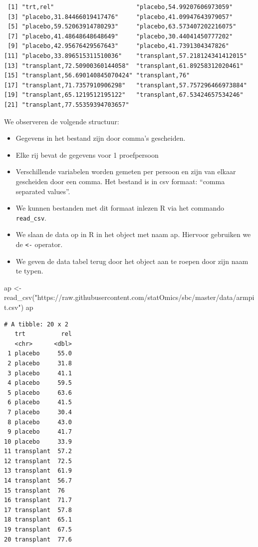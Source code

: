 \documentclass[
  dutch,
  letterpaper,
  12pt]{book}
\newenvironment{Shaded}{\begin{snugshade}}{\end{snugshade}}
\newcommand{\FunctionTok}[1]{\textcolor[rgb]{0.28,0.35,0.67}{#1}}
\newcommand{\NormalTok}[1]{\textcolor[rgb]{0.00,0.23,0.31}{#1}}
\newcommand{\OtherTok}[1]{\textcolor[rgb]{0.00,0.23,0.31}{#1}}
\newcommand{\StringTok}[1]{\textcolor[rgb]{0.13,0.47,0.30}{#1}}
\providecommand{\tightlist}{%
  \setlength{\itemsep}{0pt}\setlength{\parskip}{0pt}}
\theoremstyle{definition}
\theoremstyle{definition}
\theoremstyle{definition}
\theoremstyle{remark}
\begin{document}
\begin{verbatim}
 [1] "trt,rel"                       "placebo,54.99207606973059"    
 [3] "placebo,31.84466019417476"     "placebo,41.09947643979057"    
 [5] "placebo,59.52063914780293"     "placebo,63.573407202216075"   
 [7] "placebo,41.48648648648649"     "placebo,30.44041450777202"    
 [9] "placebo,42.95676429567643"     "placebo,41.7391304347826"     
[11] "placebo,33.896515311510036"    "transplant,57.218124341412015"
[13] "transplant,72.50900360144058"  "transplant,61.89258312020461" 
[15] "transplant,56.690140845070424" "transplant,76"                
[17] "transplant,71.7357910906298"   "transplant,57.757296466973884"
[19] "transplant,65.1219512195122"   "transplant,67.53424657534246" 
[21] "transplant,77.55359394703657" 
\end{verbatim}

We observeren de volgende structuur:

\begin{itemize}
\tightlist
\item
  Gegevens in het bestand zijn door comma's gescheiden.
\item
  Elke rij bevat de gegevens voor 1 proefpersoon
\item
  Verschillende variabelen worden gemeten per persoon en zijn van elkaar
  gescheiden door een comma. Het bestand is in csv formaat: ``comma
  separated values''.
\item
  We kunnen bestanden met dit formaat inlezen R via het commando
  \texttt{read\_csv}.
\item
  We slaan de data op in R in het object met naam ap. Hiervoor gebruiken
  we de \texttt{\textless{}-} operator.
\item
  We geven de data tabel terug door het object aan te roepen door zijn
  naam te typen.
\end{itemize}

\begin{Shaded}
\begin{Highlighting}[]
\NormalTok{ap }\OtherTok{\textless{}{-}} \FunctionTok{read\_csv}\NormalTok{(}\StringTok{"https://raw.githubusercontent.com/statOmics/sbc/master/data/armpit.csv"}\NormalTok{)}
\NormalTok{ap}
\end{Highlighting}
\end{Shaded}

\begin{verbatim}
# A tibble: 20 x 2
   trt          rel
   <chr>      <dbl>
 1 placebo     55.0
 2 placebo     31.8
 3 placebo     41.1
 4 placebo     59.5
 5 placebo     63.6
 6 placebo     41.5
 7 placebo     30.4
 8 placebo     43.0
 9 placebo     41.7
10 placebo     33.9
11 transplant  57.2
12 transplant  72.5
13 transplant  61.9
14 transplant  56.7
15 transplant  76  
16 transplant  71.7
17 transplant  57.8
18 transplant  65.1
19 transplant  67.5
20 transplant  77.6
\end{verbatim}
\end{document}
